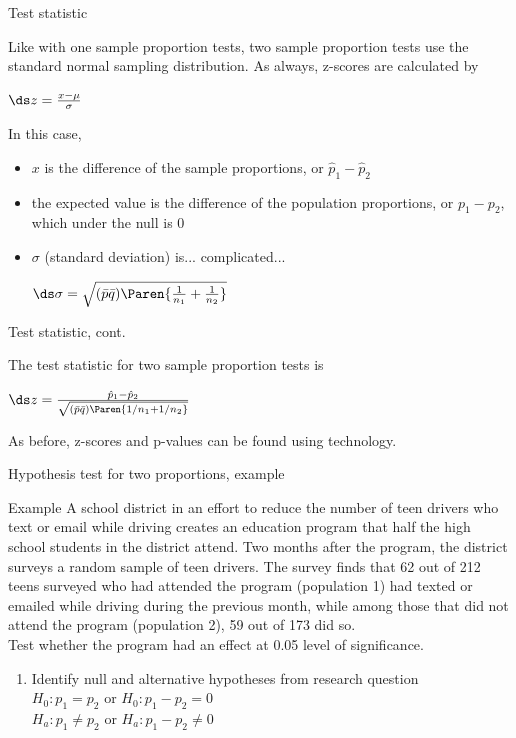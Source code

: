 \documentclass[xcolor=table, aspectratio=169, bigger]{beamer}
\begin{document}
\begin{frame}{Test statistic}
\begin{block}{}
Like with one sample proportion tests, two sample proportion tests use the standard normal sampling distribution. As always, z-scores are calculated by\\
\medskip
{\centering $\ds z = \frac{x - \mu}{\sigma}$ \par}
\pause\medskip
In this case, 
\begin{itemize}
\pause\item $x$ is the difference of the sample proportions, or $\hat p_1 - \hat p_2$
\pause\item the expected value is the difference of the population proportions, or $p_1 - p_2$, which under the null is 0
\pause\item $\sigma$ (standard deviation) is... complicated...\\
\medskip
{\centering $\ds \sigma = \sqrt{(\bar p \bar q)\Paren{\frac {1}{n_1} + \frac {1}{n_2}}}$
\par}
\medskip
\end{itemize}
\end{block}
\end{frame}

\begin{frame}{Test statistic, cont.}
\begin{block}{}
The test statistic for two sample proportion tests is\\
\medskip
{\centering $\ds z = \frac{\hat p_1 - \hat p_2}{\sqrt{(\bar p \bar q)\Paren{1/n_1 + 1/n_2}}}$ \par}
\medskip
As before, z-scores and p-values can be found using technology.
\end{block}
\end{frame}


\begin{frame}{Hypothesis test for two proportions, example}
\begin{exampleblock}{Example}
A school district in an effort to reduce the number of teen drivers who text or email while driving creates an education program that half the high school students in the district attend. Two months after the program, the district surveys a random sample of teen drivers. The survey finds that 62 out of 212 teens surveyed who had attended the program (population 1) had texted or emailed while driving during the previous month, while among those that did not attend the program (population 2), 59 out of 173 did so.\\
\medskip
Test whether the program had an effect at 0.05 level of significance.
\begin{enumerate}
\pause\item Identify null and alternative hypotheses from research question\\
\pause$H_0: p_1 = p_2$ or $H_0: p_1 - p_2 = 0$\\
$H_a: p_1 \ne p_2$ or $H_a: p_1 - p_2 \ne 0$\\
\end{enumerate}
\end{exampleblock}
\end{frame}
\end{document}
